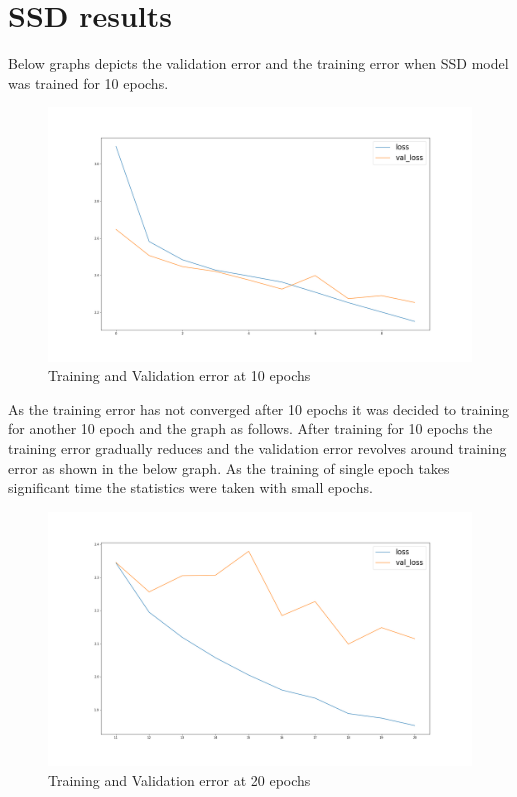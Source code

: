 \section{SSD results}
Below graphs depicts the validation error and the training error when SSD model was trained for 10 epochs.
\begin{figure}[H]
\includegraphics[scale=0.3]{conf0_loss-val_loss_0_10epochs}
\begin{center}
\caption{Training and Validation error at 10 epochs}
\end{center}
\end{figure}
As the training error has not converged after 10 epochs it was decided to training for another 10 epoch and the graph as follows. After training for 10 epochs the training error gradually reduces and the validation error revolves around training error as shown in the below graph. As the training of single epoch takes significant time the statistics were taken with small epochs.

\begin{figure}[H]
\includegraphics[scale=0.3]{conf0_loss-val_loss_10_20epochs}
\begin{center}
\caption{Training and Validation error at 20 epochs}
\end{center}
\end{figure}


